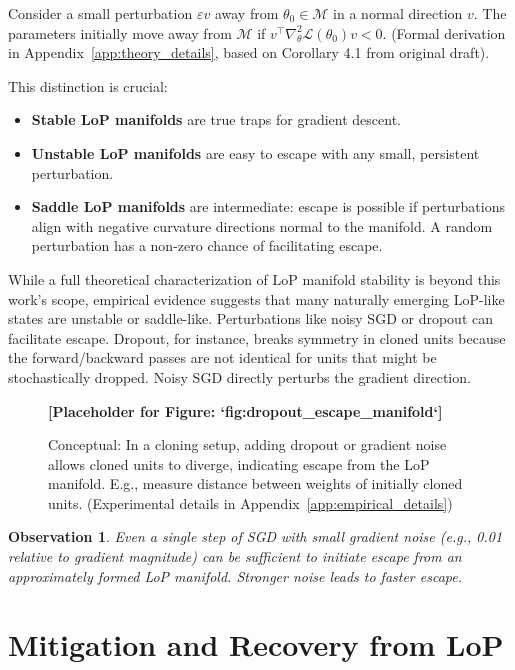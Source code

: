 \documentclass{article}
\newcommand{\Loss}{\mathcal{L}}
\newtheorem{observation}{Observation}[section]
\begin{document}
Consider a small perturbation $\varepsilon v$ away from $\theta_0 \in \mathcal{M}$ in a normal direction $v$. The parameters initially move away from $\mathcal{M}$ if $v^\top\nabla_\theta^2\Loss(\theta_0)v < 0$. (Formal derivation in Appendix~\ref{app:theory_details}, based on Corollary 4.1 from original draft).

This distinction is crucial:
\begin{itemize}
    \item \textbf{Stable LoP manifolds} are true traps for gradient descent.
    \item \textbf{Unstable LoP manifolds} are easy to escape with any small, persistent perturbation.
    \item \textbf{Saddle LoP manifolds} are intermediate: escape is possible if perturbations align with negative curvature directions normal to the manifold. A random perturbation has a non-zero chance of facilitating escape.
\end{itemize}

While a full theoretical characterization of LoP manifold stability is beyond this work's scope, empirical evidence suggests that many naturally emerging LoP-like states are unstable or saddle-like. Perturbations like noisy SGD or dropout can facilitate escape.
Dropout, for instance, breaks symmetry in cloned units because the forward/backward passes are not identical for units that might be stochastically dropped. Noisy SGD directly perturbs the gradient direction.

\begin{figure}[ht!]
    \centering
    \textbf{[Placeholder for Figure: `fig:dropout_escape_manifold`]}
    \caption{Conceptual: In a cloning setup, adding dropout or gradient noise allows cloned units to diverge, indicating escape from the LoP manifold. E.g., measure distance between weights of initially cloned units. (Experimental details in Appendix~\ref{app:empirical_details})}
    \label{fig:dropout_escape_manifold_placeholder}
\end{figure}

\begin{observation}
Even a single step of SGD with small gradient noise (e.g., 0.01 relative to gradient magnitude) can be sufficient to initiate escape from an approximately formed LoP manifold. Stronger noise leads to faster escape.
\end{observation}

\section{Mitigation and Recovery from LoP}
\label{sec:mitigation_recovery}
\end{document}
